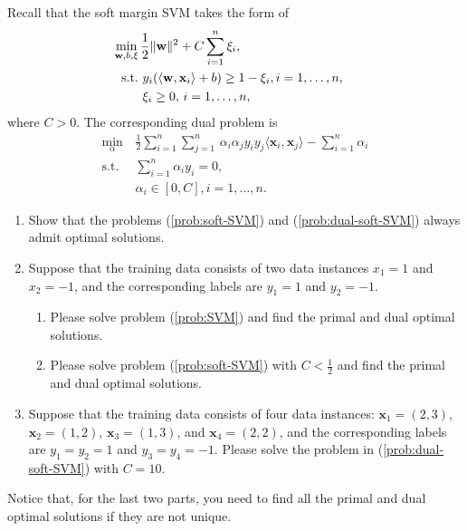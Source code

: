 \documentclass[11pt,letter,notitlepage]{article}
\begin{document}
\newpage
\begin{exercise}
     Recall that the soft margin SVM takes the form of
\begin{align}\label{prob:soft-SVM}
\min_{\mathbf{w},b,\xi}\,&\frac{1}{2}\|\mathbf{w}\|^2+C\sum_{i=1}^n\xi_i,\\ \nonumber
{\rm s.t.\,}&\,y_i(\langle\mathbf{w},\mathbf{x}_i\rangle+b)\geq1-\xi_i,i=1,\ldots,n,&\\ \nonumber
&\,\xi_i\geq0,\,i=1,\ldots,n,
\end{align}
where $C>0$.
The corresponding dual problem is
\begin{align}\label{prob:dual-soft-SVM}
		\min_{\alpha}\,&\frac{1}{2}\sum_{i=1}^n\sum_{j=1}^n\,\alpha_i\alpha_jy_iy_j\langle\mathbf{x}_i,\mathbf{x}_j\rangle-\sum_{i=1}^n\alpha_i\\\nonumber
	\mbox{s.t. }\,&\sum_{i=1}^n\alpha_iy_i=0,\\\nonumber
	&\alpha_i\in[0,C],i=1,\ldots,n.
\end{align}
\begin{enumerate}
    \item Show that the problems (\ref{prob:soft-SVM}) and (\ref{prob:dual-soft-SVM}) always admit optimal solutions.
    
    \item Suppose that the training data consists of two data instances $x_1=1$ and $x_2=-1$, and the corresponding labels are $y_1=1$ and $y_2=-1$.
    \begin{enumerate}
        \item Please solve problem (\ref{prob:SVM}) and find the primal and dual optimal solutions.
        \item Please solve problem (\ref{prob:soft-SVM}) with $C<\frac{1}{2}$ and find the primal and dual optimal solutions.
    \end{enumerate}

    \item Suppose that the training data consists of four data instances: $\mathbf{x}_1=(2,3)$, $\mathbf{x}_2=(1,2)$, $\mathbf{x}_3=(1,3)$, and $\mathbf{x}_4=(2,2)$, and the corresponding labels are $y_1=y_2=1$ and $y_3=y_4=-1$. Please solve the problem in (\ref{prob:dual-soft-SVM}) with $C=10$.
\end{enumerate}
Notice that, for the last two parts, you need to find all the primal and dual optimal solutions if they are not unique.
\end{exercise}

\end{document}
